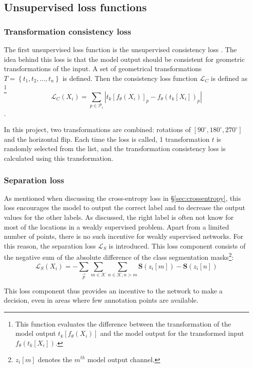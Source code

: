 

\subsection{Unsupervised loss functions}

\subsubsection{Transformation consistency loss}
The first unsupervised loss function is the unsupervised consistency loss . 
The idea behind this loss is that the model output should be consistent for geometric transformations of the input.
A set of geometrical transformations $T=\left\{ t_1, t_2, \dots, t_n \right\}$ is defined. 
Then the consistency loss function $\mathcal{L}_C$ is defined as
\footnote{This function evaluates the difference between the transformation of the model output $t_k\left[f_\theta(X_i)\right]$ and the model output for the transformed input $f_\theta\left( t_k[X_i] \right)$.}
\begin{equation}
    \mathcal{L}_C(X_i) = \sum_{p \in \mathcal{P}_i} \left| t_k\left[f_\theta(X_i)\right]_p - f_\theta\left( t_k[X_i] \right)_p  \right|  
\end{equation}.

In this project, two transformations are combined: rotations of $[90^{\circ}, 180^{\circ}, 270^{\circ}]$ and the horizontal flip.
Each time the loss is called, 1 transformation $t$ is randomly selected from the list, and the transformation consistency loss is calculated using this transformation.

\subsubsection{Separation loss}
As mentioned when discussing the cross-entropy loss in §\ref{sec:crossentropy}, this loss encourages the model to output the correct label and to decrease the output values for the other labels.
As discussed, the right label is often not know for most of the locations in a weakly supervised problem.
Apart from a limited number of points, there is no such incentive for weakly supervised networks.
For this reason, the separation loss $\mathcal{L}_S$ is introduced.
This loss component consists of the negative sum of the absolute difference of the class segmentation masks\footnote{$z_i[m]$ denotes the $m^{th}$ model output channel.}:
\begin{equation}
    \mathcal{L}_S(X_i) = - \sum_{\vec{p}} \sum_{m\in \mathcal{K}} \sum_{n \in \mathcal{K}, n>m} \mathbf{S}(z_i[m]) - \mathbf{S}(z_i[n])
\end{equation}

This loss component thus provides an incentive to the network to make a decision, even in areas where few annotation points are available.